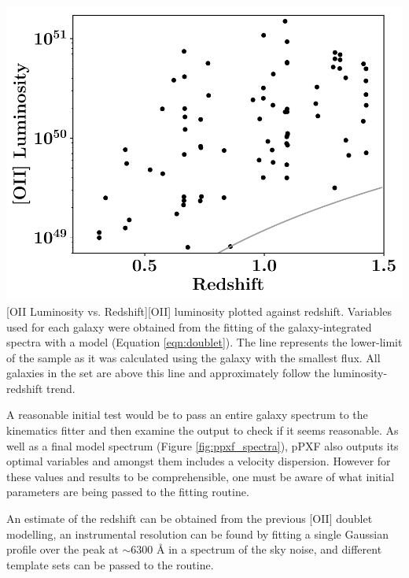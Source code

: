 \documentclass[12pt, twocolumn]{revtex4}    %
\begin{document}
\begin{center}
\includegraphics[width=1.0\linewidth]{data/o_ii_luminosity_vs_redshift}
[OII Luminosity vs. Redshift]{[OII] luminosity plotted against redshift. Variables used for each galaxy were obtained from the fitting of the galaxy-integrated spectra with a model (Equation \ref{eqn:doublet}). The line represents the lower-limit of the sample as it was calculated using the galaxy with the smallest flux. All galaxies in the set are above this line and approximately follow the luminosity-redshift trend.}
\label{fig:oiiluminosity_redshift}
\end{center} 

A reasonable initial test would be to pass an entire galaxy spectrum to the kinematics fitter and then examine the output to check if it seems reasonable. As well as a final model spectrum (Figure \ref{fig:ppxf_spectra}), pPXF also outputs its optimal variables and amongst them includes a velocity dispersion. However for these values and results to be comprehensible, one must be aware of what initial parameters are being passed to the fitting routine. 

An estimate of the redshift can be obtained from the previous [OII] doublet modelling, an instrumental resolution can be found by fitting a single Gaussian profile over the peak at $\sim6300$ {\AA} in a spectrum of the sky noise, and different template sets can be passed to the routine. 


\end{document}
